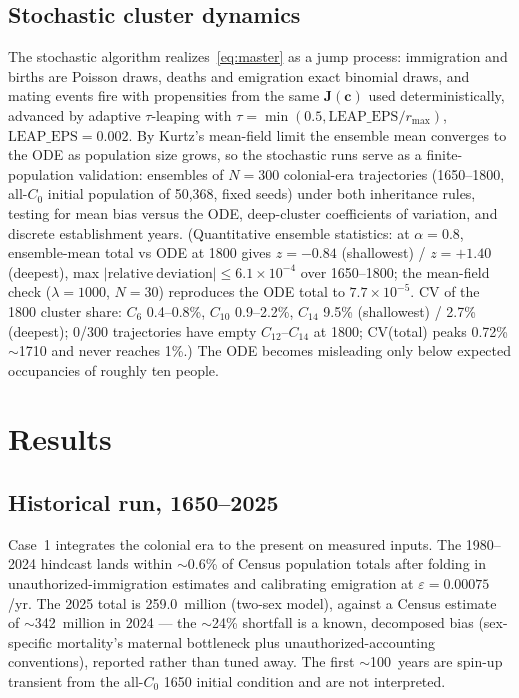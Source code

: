 \documentclass[11pt,a4paper]{article}
\begin{document}
\subsection{Stochastic cluster dynamics}
\label{sec:stoch}
The stochastic algorithm realizes~\eqref{eq:master} as a jump process:
immigration and births are Poisson draws, deaths and emigration exact
binomial draws, and mating events fire with propensities from the same
$\mathbf{J}(\mathbf{c})$ used deterministically, advanced by adaptive
$\tau$-leaping \cite{gillespie1976,gillespie2001,cao-gillespie-petzold-2006}
with $\tau=\min(0.5,\mathrm{LEAP\_EPS}/r_{\max})$,
$\mathrm{LEAP\_EPS}=0.002$.  By Kurtz's mean-field limit
\cite{kurtz1970} the ensemble mean converges to the ODE as population
size grows, so the stochastic runs serve as a finite-population
validation: ensembles of $N=300$ colonial-era trajectories (1650--1800,
all-$C_0$ initial population of 50{,}368, fixed seeds) under both
inheritance rules, testing for mean bias versus the ODE, deep-cluster
coefficients of variation, and discrete establishment years.
(Quantitative ensemble statistics: at $\alpha=0.8$, ensemble-mean
total vs ODE at 1800 gives $z=-0.84$ (shallowest) / $z=+1.40$
(deepest), max $|\mathrm{relative\ deviation}|\le6.1\times10^{-4}$
over 1650--1800; the mean-field check ($\lambda=1000$, $N=30$)
reproduces the ODE total to $7.7\times10^{-5}$.  CV of the 1800
cluster share: $C_6$ 0.4--0.8\%, $C_{10}$ 0.9--2.2\%, $C_{14}$ 9.5\%
(shallowest) / 2.7\% (deepest); 0/300 trajectories have empty
$C_{12}$--$C_{14}$ at 1800; CV(total) peaks 0.72\% $\sim$1710 and never
reaches 1\%.)
The ODE becomes misleading only below expected occupancies of roughly
ten people.
\section{Results}
\label{sec:results}

\subsection{Historical run, 1650--2025}
\label{sec:case1}
Case~1 integrates the colonial era to the present on measured inputs.
The 1980--2024 hindcast lands within $\sim$0.6\% of Census population
totals after folding in unauthorized-immigration estimates and
calibrating emigration at $\varepsilon=0.00075$/yr.  The 2025 total is
259.0~million (two-sex model), against a Census estimate of
$\sim$342~million in 2024 --- the $\sim$24\% shortfall is a known,
decomposed bias (sex-specific mortality's maternal bottleneck plus
unauthorized-accounting conventions), reported rather than tuned away.
The first $\sim$100~years are spin-up transient from the all-$C_0$
1650 initial condition and are not interpreted.
\end{document}
